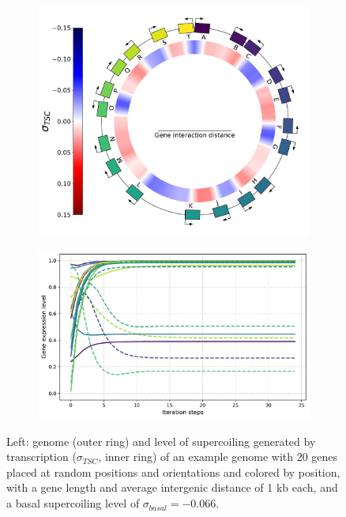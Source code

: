 \begin{figure}[H]
  \centering
  \begin{subfigure}[t]{0.44\textwidth}
    \includegraphics[width=\textwidth]{ploscb/img/random_genome_and_tsc.pdf}
    \label{subfig:ploscb:random_genome}
  \end{subfigure}
  \begin{subfigure}[t]{0.55\textwidth}
    \includegraphics[width=\textwidth]{ploscb/img/random_gene_expr.pdf}
    \label{subfig:ploscb:random_expr}
  \end{subfigure}
  \caption[Example individual in the advanced model, evaluated in both environments]{Left: genome (outer ring) and level of supercoiling generated by transcription ($\sigma_{TSC}$, inner ring) of an example genome with 20 genes placed at random positions and orientations and colored by position, with a gene length and average intergenic distance of 1 kb each, and a basal supercoiling level of $\sigma_{basal} = -0.066$.
}
\end{figure}
